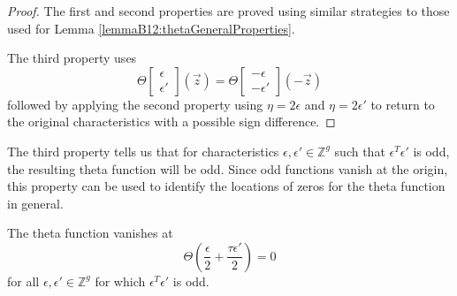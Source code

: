 \begin{proof}
    The first and second properties are proved using similar strategies to those used for Lemma \ref{lemmaB12:thetaGeneralProperties}.

    The third property uses
    \begin{equation}
        \Theta\begin{bmatrix}\epsilon \\ \epsilon'\end{bmatrix}(\vec z) = \Theta\begin{bmatrix}-\epsilon \\ -\epsilon'\end{bmatrix}(-\vec z)
    \end{equation}
    followed by applying the second property using $\eta=2\epsilon$ and $\eta=2\epsilon'$ to return to the original characteristics with a possible sign difference.
\end{proof}

The third property tells us that for characteristics $\epsilon,\epsilon' \in \mathbb Z^g$ such that $\epsilon^T\epsilon'$ is odd, the resulting theta function will be odd. Since odd functions vanish at the origin, this property can be used to identify the locations of zeros for the theta function in general.

\begin{theorem}\label{thmB12:OddLocations}
    The theta function vanishes at
    \begin{equation}
        \Theta\left(\frac{\epsilon}{2} + \frac{\tau \epsilon'}{2}\right) = 0
    \end{equation}
    for all $\epsilon,\epsilon' \in \mathbb Z^g$ for which $\epsilon^T \epsilon'$ is odd.
\end{theorem}


